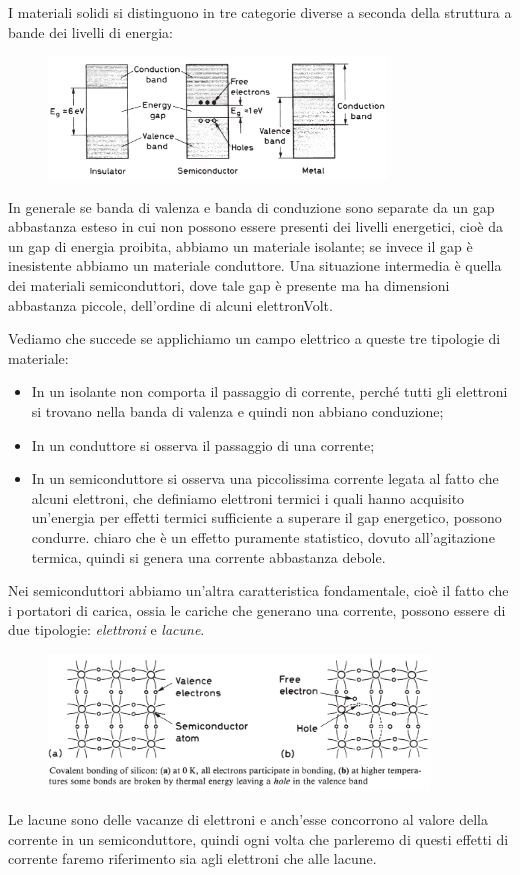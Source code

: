 I materiali solidi si distinguono in tre categorie diverse a seconda della struttura a bande dei livelli di energia:
\begin{figure}[H]
   \centering
   \includegraphics[width=0.8\textwidth]{immagini/bande_valenza_e_conduzione.png}
\end{figure}
In generale se banda di valenza e banda di conduzione sono separate da un gap abbastanza esteso in cui non possono essere presenti dei livelli energetici, cioè da un gap di energia proibita, abbiamo un materiale isolante; se invece il gap è inesistente abbiamo un materiale conduttore. Una situazione intermedia è quella dei materiali semiconduttori, dove tale gap è presente ma ha dimensioni abbastanza piccole, dell'ordine di alcuni elettronVolt.

Vediamo che succede se applichiamo un campo elettrico a queste tre tipologie di materiale:
\begin{itemize}[leftmargin=0.5cm]
   \item In un isolante non comporta il passaggio di corrente, perché tutti gli elettroni si trovano nella banda di valenza e quindi non abbiano conduzione;
   \item In un conduttore si osserva il passaggio di una corrente;
   \item In un semiconduttore si osserva una piccolissima corrente legata al fatto che alcuni elettroni, che definiamo elettroni termici i quali hanno acquisito un'energia per effetti termici sufficiente a superare il gap energetico, possono condurre. \E chiaro che è un effetto puramente statistico, dovuto all'agitazione termica, quindi si genera una corrente abbastanza debole.
\end{itemize}
Nei semiconduttori abbiamo un'altra caratteristica fondamentale, cioè il fatto che i portatori di carica, ossia le cariche che generano una corrente, possono essere di due tipologie: \textit{elettroni} e \textit{lacune}.
\begin{figure}[H]
   \centering
   \includegraphics[width=0.9\textwidth]{immagini/elettroni_e_lacune_semiconduttori.png}
\end{figure}
Le lacune sono delle vacanze di elettroni e anch'esse concorrono al valore della corrente in un semiconduttore, quindi ogni volta che parleremo di questi effetti di corrente faremo riferimento sia agli elettroni che alle lacune.

